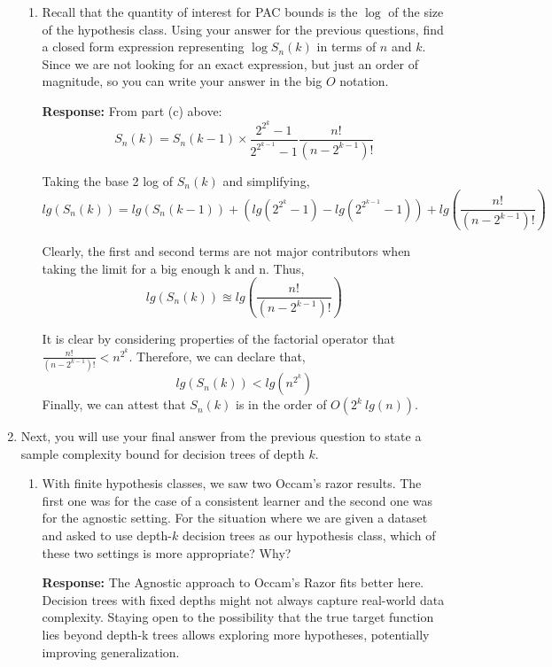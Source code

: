 \begin{enumerate}
\begin{enumerate}
  \item \relax[6 points] Recall that the quantity of interest for PAC bounds is
    the $\log$ of the size of the hypothesis class. Using your answer for the
    previous questions, find a closed form expression representing $\log S_n(k)$
    in terms of $n$ and $k$. Since we are not looking for an exact expression,
    but just an order of magnitude, so you can write your answer in the big $O$
    notation. \newline 
    
    \textbf{Response:} From part (c) above: $$S_n(k) = S_n(k-1) \times \frac{2^{2^{k}}-1}{2^{2^{k-1}}-1} \frac{n!}{(n-2^{k-1})!}$$
    
    Taking the base 2 log of $S_n(k)$ and simplifying, 
    $$lg(S_n(k)) = lg(S_n(k-1)) + (lg({2^{2^k}-1})-lg(2^{2^{k-1}}-1)) + lg(\frac{n!}{(n-2^{k-1})!})$$
    
    Clearly, the first and second terms are not major contributors when taking the limit for a big enough k and n. Thus, $$lg(S_n(k)) \approxeq lg(\frac{n!}{(n-2^{k-1})!})$$
    
    It is clear by considering properties of the factorial operator that $\frac{n!}{(n-2^{k-1})!} < n^{2^k}$. Therefore, we can declare that, $$lg(S_n(k)) < lg(n^{2^k})$$
    Finally, we can attest that $S_n(k)$ is in the order of $O(2^k \: lg(n))$.
  \end{enumerate}

\item Next, you will use your final answer from the previous question to state a
  sample complexity bound for decision trees of depth $k$.

  \begin{enumerate}
  \item \relax[3 points] With finite hypothesis classes, we saw two Occam's
    razor results. The first one was for the case of a consistent learner and
    the second one was for the agnostic setting. For the situation where we are
    given a dataset and asked to use depth-$k$ decision trees as our hypothesis
    class, which of these two settings is more appropriate? Why?
    
    \textbf{Response:} 
    The Agnostic approach to Occam’s Razor fits better here. Decision trees with fixed depths might not always capture real-world data complexity. Staying open to the possibility that the true target function lies beyond depth-k trees allows exploring more hypotheses, potentially improving generalization.


\end{enumerate}
\end{enumerate}
